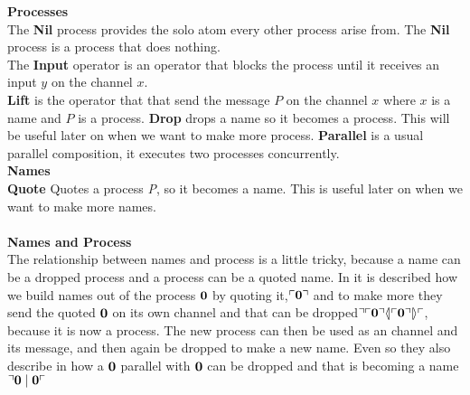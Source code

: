 \textbf{Processes}\\ %
The \textbf{Nil} process provides the solo atom every other process arise from. The \textbf{Nil} process is a process that does nothing.\\
The \textbf{Input} operator is an operator that blocks the process until it receives an input $y$ on the channel $x$.\\
\textbf{Lift} is the operator that that send the message $P$ on the channel $x$ where $x$ is a name and $P$ is a process.
\textbf{Drop} drops a name so it becomes a process. This will be useful later on when we want to make more process.
\textbf{Parallel} is a usual parallel composition, it executes two processes concurrently.\\

\textbf{Names}\\ %
\textbf{Quote} Quotes a process \textit{P}, so it becomes a name. This is useful later on when we want to make more names. %
\\\\
\textbf{Names and Process}\\
The relationship between names and process is a little tricky, because a name can be a dropped process and a process can be a quoted name. In \citep{Meredith2005} it is described how we build names out of the process $\mathbf{0}$ by quoting it,$\ulcorner \mathbf{0} \urcorner$ and to make more they send the quoted $\mathbf{0}$ on its own channel and that can be dropped$\urcorner \ulcorner \mathbf{0} \urcorner \langle \! | \ulcorner \mathbf{0} \urcorner | \! \rangle \ulcorner$, because it is now a process. The new process can then be used as an channel and its message, and then again be dropped to make a new name. Even so they also describe in \citep{Meredith2005} how a $\mathbf{0}$ parallel with $\mathbf{0}$ can be dropped and that is becoming a name $\urcorner \mathbf{0} \mid \mathbf{0} \ulcorner$